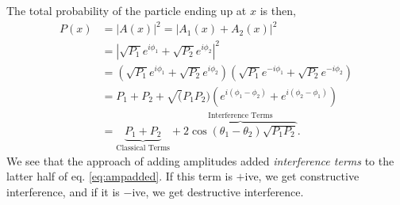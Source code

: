 \documentclass{book}
\begin{document}
The total probability of the particle ending up at $x$ is then,
\begin{equation}
\begin{split}
	P(x) &= |A(x)|^2 = |A_1(x) + A_2(x)|^2\\
	& = |\sqrt{P_1}e^{i\phi_1} + \sqrt{P_2}e^{i\phi_2}|^2 \\
	& = (\sqrt{P_1}e^{i\phi_1} + \sqrt{P_2}e^{i\phi_2})(\sqrt{P_1}e^{-i\phi_1} + \sqrt{P_2}e^{-i\phi_2}) \\
	& = P_1 + P_2 + \sqrt(P_1P_2)\left(e^{i(\phi_1-\phi_2)} + e^{i(\phi_2-\phi_1)}\right) \\
	& = \underbrace{P_1 + P_2}_{\text{Classical Terms}} + \overbrace{2\cos(\theta_1 - \theta_2)\sqrt{P_1P_2}}^{\text{Interference Terms}}. \label{eq:ampadded}
\end{split}
\end{equation}
We see that the approach of adding amplitudes added \textit{interference terms} to the latter half of eq. \eqref{eq:ampadded}. If this term is $+$ive, we get constructive interference, and if it is $-$ive, we get destructive interference.
\end{document}
